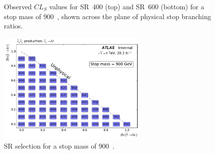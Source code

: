 \begin{figure}[ht]
  \centering
  \caption{
    Observed
    $CL_S$ values for SR~400 (top) and SR~600 (bottom) for a stop mass of
    900~\GeV,
    shown across the plane of physical stop branching ratios.
  }
\end{figure}

\begin{figure}[ht]
  \centering
  \includegraphics[width=0.65\textwidth]
    {figs/blstop/region_selection/region_choice_vs_br_m_900.pdf}
  \caption{
    SR selection for a stop mass of 900~\GeV.
  }
\end{figure}

